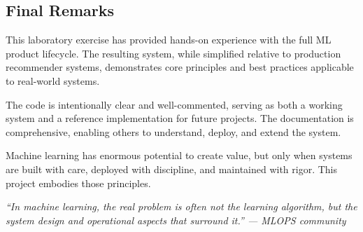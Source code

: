 
\subsection{Final Remarks}

This laboratory exercise has provided hands-on experience with the full ML product lifecycle. The resulting 
system, while simplified relative to production recommender systems, demonstrates core principles and best 
practices applicable to real-world systems.

The code is intentionally clear and well-commented, serving as both a working system and a reference 
implementation for future projects. The documentation is comprehensive, enabling others to understand, 
deploy, and extend the system.

Machine learning has enormous potential to create value, but only when systems are built with care, deployed 
with discipline, and maintained with rigor. This project embodies those principles.

\vspace{1cm}

\noindent%
\textit{``In machine learning, the real problem is often not the learning algorithm, but the system design 
and operational aspects that surround it.'' --- MLOPS community}


